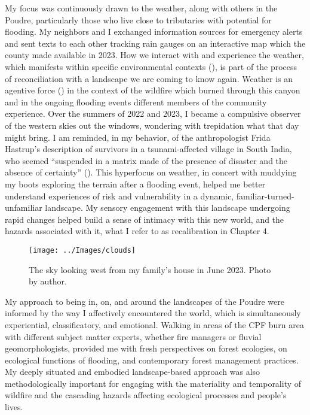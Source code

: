 \documentclass[
]{article}
\begin{document}
My focus was continuously drawn to the weather, along with others in the Poudre, particularly those who live close to tributaries with potential for flooding. My neighbors and I exchanged information sources for emergency alerts and sent texts to each other tracking rain gauges on an interactive map which the county made available in 2023. How we interact with and experience the weather, which manifests within specific environmental contexts (), is part of the process of reconciliation with a landscape we are coming to know again. Weather is an agentive force () in the context of the wildfire which burned through this canyon and in the ongoing flooding events different members of the community experience. Over the summers of 2022 and 2023, I became a compulsive observer of the western skies out the windows, wondering with trepidation what that day might bring. I am reminded, in my behavior, of the anthropologist Frida Hastrup's description of survivors in a tsunami-affected village in South India, who seemed ``suspended in a matrix made of the presence of disaster and the absence of certainty'' (). This hyperfocus on weather, in concert with muddying my boots exploring the terrain after a flooding event, helped me better understand experiences of risk and vulnerability in a dynamic, familiar-turned-unfamiliar landscape. My sensory engagement with this landscape undergoing rapid changes helped build a sense of intimacy with this new world, and the hazards associated with it, what I refer to as recalibration in Chapter 4.

\begin{figure}
\texttt{[image: ../Images/clouds]} \caption[Black Hollow house remains]{The sky looking west from my family's house in June 2023. Photo by author.}\label{fig:figureTitle-21}
\end{figure}

My approach to being in, on, and around the landscapes of the Poudre were informed by the way I affectively encountered the world, which is simultaneously experiential, classificatory, and emotional. Walking in areas of the CPF burn area with different subject matter experts, whether fire managers or fluvial geomorphologists, provided me with fresh perspectives on forest ecologies, on ecological functions of flooding, and contemporary forest management practices. My deeply situated and embodied landscape-based approach was also methodologically important for engaging with the materiality and temporality of wildfire and the cascading hazards affecting ecological processes and people's lives.
\end{document}
